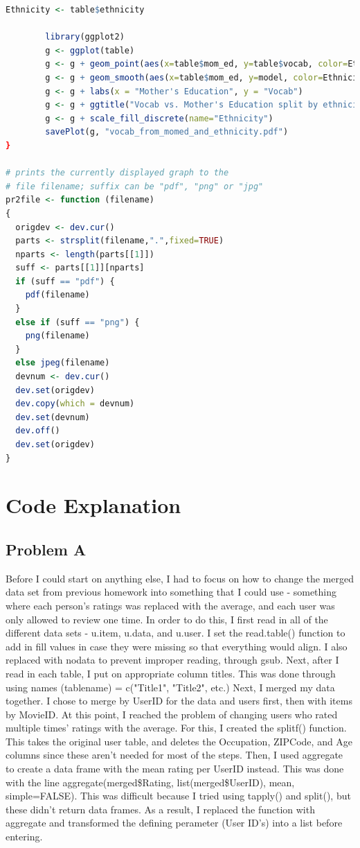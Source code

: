 \documentclass{article}
\begin{document}
\begin{lstlisting}[language=R]
        Ethnicity <- table$ethnicity

        library(ggplot2)
        g <- ggplot(table)
        g <- g + geom_point(aes(x=table$mom_ed, y=table$vocab, color=Ethnicity))
        g <- g + geom_smooth(aes(x=table$mom_ed, y=model, color=Ethnicity))
        g <- g + labs(x = "Mother's Education", y = "Vocab")
        g <- g + ggtitle("Vocab vs. Mother's Education split by ethnicity")
        g <- g + scale_fill_discrete(name="Ethnicity") 
        savePlot(g, "vocab_from_momed_and_ethnicity.pdf")
}

# prints the currently displayed graph to the
# file filename; suffix can be "pdf", "png" or "jpg"
pr2file <- function (filename)
{
  origdev <- dev.cur()
  parts <- strsplit(filename,".",fixed=TRUE)
  nparts <- length(parts[[1]])
  suff <- parts[[1]][nparts]
  if (suff == "pdf") {
    pdf(filename)
  }
  else if (suff == "png") {
    png(filename)
  }
  else jpeg(filename)
  devnum <- dev.cur()
  dev.set(origdev)
  dev.copy(which = devnum)
  dev.set(devnum)
  dev.off()
  dev.set(origdev)
}

        \end{lstlisting}

\section*{Code Explanation}
  \subsection*{Problem A}
    Before I could start on anything else, I had to focus on how to change the merged data
    set from previous homework into something that I could use - something where
    each person's ratings was replaced with the average, and each user was only allowed
    to review one time. In order to do this, I first read in all of the different
    data sets - u.item, u.data, and u.user. I set the read.table() function
    to add in fill values in case they were missing so that everything would align. 
    I also replaced \textbar \textbar with \textbar nodata \textbar to prevent improper
    reading, through gsub. Next, after I read in each table, I put on appropriate 
    column titles. This was done through using names (tablename) = c("Title1", "Title2", etc.)
    Next, I merged my data together. I chose to merge by UserID for the data and users
    first, then with items by MovieID. At this point, I reached the problem of changing
    users who rated multiple times' ratings with the average. 
    For this, I created the splitf() function. This takes the original user table, 
    and deletes the Occupation, ZIPCode, and Age columns since these aren't needed
    for most of the steps. Then, I used aggregate to create a data frame with the mean rating
    per UserID instead. This was done with the line 
    aggregate(merged\$Rating, list(merged\$UserID), mean, simple=FALSE). This was 
    difficult because I tried using tapply() and split(), but these didn't return
    data frames. As a result, I replaced the function with aggregate and transformed
    the defining perameter (User ID's) into a list before entering. 
\end{document}
